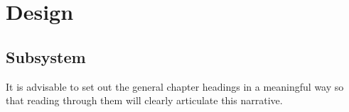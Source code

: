 \documentclass[../individual_thesis.tex]{subfiles}
\begin{document}
\chapter{Design}
\section{Subsystem}
It is advisable to set out the general chapter headings in a meaningful way so that reading through them will clearly articulate this narrative.
\end{document}
